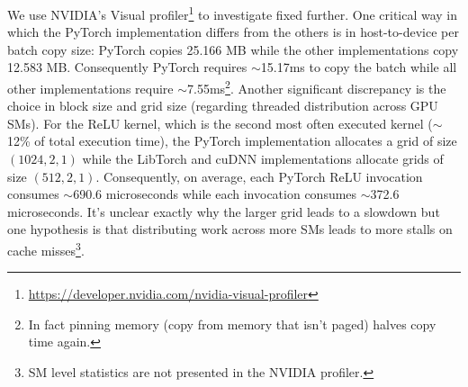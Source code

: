 We use NVIDIA's Visual profiler\footnote{\url{https://developer.nvidia.com/nvidia-visual-profiler}} to investigate fixed  further.
One critical way in which the PyTorch implementation differs from the others is in host-to-device per batch copy size: PyTorch copies 25.166 MB while the other implementations copy 12.583 MB\@.
Consequently PyTorch requires $\sim$15.17ms to copy the batch while all other implementations require $\sim$7.55ms\footnote{In fact pinning memory (copy from memory that isn't paged) halves copy time again.}.
Another significant discrepancy is the choice in block size and grid size (regarding threaded distribution across GPU SMs).
For the ReLU kernel, which is the second most often executed kernel ($\sim$12\% of total execution time), the PyTorch implementation allocates a grid of size $\left( 1024,2,1 \right)$ while the LibTorch and cuDNN implementations allocate grids of size $\left( 512,2,1 \right)$.
Consequently, on average, each PyTorch ReLU invocation consumes $\sim$690.6 microseconds while each invocation consumes $\sim$372.6 microseconds.
It's unclear exactly why the larger grid leads to a slowdown but one hypothesis is that distributing work across more SMs leads to more stalls on cache misses\footnote{SM level statistics are not presented in the NVIDIA profiler.}.



